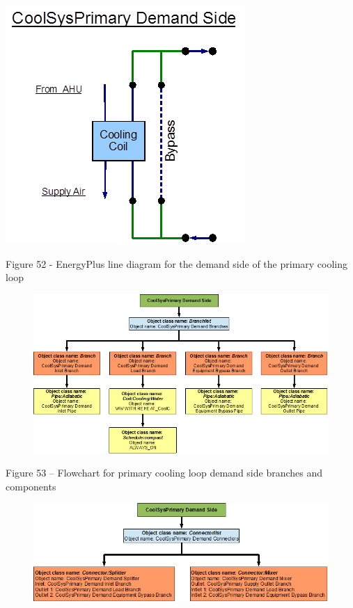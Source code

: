 \textbf{\includegraphics{media/image052.png}}

Figure 52 - EnergyPlus line diagram for the demand side of the primary cooling loop

\begin{figure}[htbp]
\centering
\includegraphics{media/image053.png}
\caption{}
\end{figure}

Figure 53 -- Flowchart for primary cooling loop demand side branches and components

\begin{figure}[htbp]
\centering
\includegraphics{media/image054.png}
\caption{}
\end{figure}

